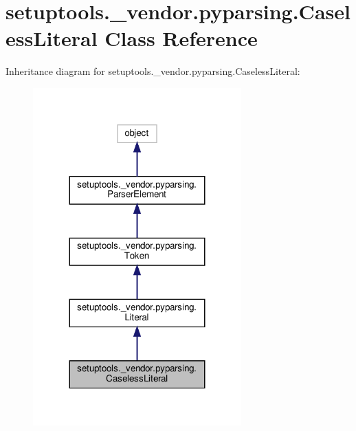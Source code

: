 \hypertarget{classsetuptools_1_1__vendor_1_1pyparsing_1_1CaselessLiteral}{}\section{setuptools.\+\_\+vendor.\+pyparsing.\+Caseless\+Literal Class Reference}
\label{classsetuptools_1_1__vendor_1_1pyparsing_1_1CaselessLiteral}


Inheritance diagram for setuptools.\+\_\+vendor.\+pyparsing.\+Caseless\+Literal\+:
\nopagebreak
\begin{figure}[H]
\begin{center}
\leavevmode
\includegraphics[width=227pt]{classsetuptools_1_1__vendor_1_1pyparsing_1_1CaselessLiteral__inherit__graph}
\end{center}
\end{figure}


